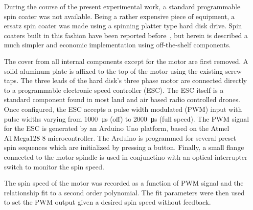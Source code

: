 During the course of the present experimental work, a standard programmable
spin coater was not available.  Being a rather expensive piece of equipment, a
ersatz spin coater was made using a spinning platter type hard disk drive.
Spin coaters built in this fashion have been reported
before~\cite{bianchi2006spin}, but herein is described a much simpler and
economic implementation using off-the-shelf components.

The cover from all internal components except for the motor are first removed.
A solid aluminum plate is affixed to the top of the motor using the existing
screw taps.  The three leads of the hard disk's three phase motor are
connected directly to a programmable electronic speed controller (ESC).  The
ESC itself is a standard component found in most land and air based radio
controlled drones.  Once configured, the ESC accepts a pulse width modulated
(PWM) input with pulse widths varying from \SI{1000}{\micro\second} (off) to
\SI{2000}{\micro\second} (full speed).  The PWM signal for the ESC is
generated by an Arduino Uno platform, based on the Atmel ATMega128
\SI{8}{\bit} microcontroller.  The Arduino is programmed for several preset
spin sequences which are initialized by pressing a button.  Finally, a small
flange connected to the motor spindle is used in conjunctino with an optical
interrupter switch to monitor the spin speed.


The spin speed of the motor was recorded as a function of PWM signal and
the relationship fit to a second order polynomial.  The fit parameters were
then used to set the PWM output given a desired spin speed without
feedback.

